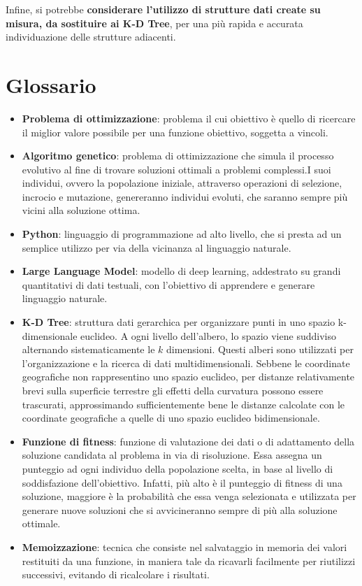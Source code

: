 \documentclass{CSUniSchoolLabReport}
\begin{document}
Infine, si potrebbe \textbf{considerare l'utilizzo di strutture dati create su misura, da sostituire ai K-D Tree}, per una più rapida e accurata individuazione delle strutture adiacenti.

\pagebreak{}
\section{Glossario}

\begin{itemize}
   \item \textbf{Problema di ottimizzazione}: problema il cui obiettivo è quello di ricercare il miglior valore possibile per una funzione obiettivo, soggetta a vincoli.
   \item \textbf{Algoritmo genetico}: problema di ottimizzazione che simula il processo evolutivo al fine di trovare soluzioni ottimali a problemi complessi.I suoi individui, ovvero la popolazione iniziale, attraverso operazioni di selezione, incrocio e mutazione, genereranno individui evoluti, che saranno sempre più vicini alla soluzione ottima.
   \item \textbf{Python}: linguaggio di programmazione ad alto livello, che si presta ad un semplice utilizzo per via della vicinanza al linguaggio naturale.
   \item \textbf{Large Language Model}: modello di deep learning, addestrato su grandi quantitativi di dati testuali, con l'obiettivo di apprendere e generare linguaggio naturale.
   \item \textbf{K-D Tree}: struttura dati gerarchica per organizzare punti in uno spazio k-dimensionale euclideo. A ogni livello dell'albero, lo spazio viene suddiviso alternando sistematicamente le $k$ dimensioni. Questi alberi sono utilizzati per l'organizzazione e la ricerca di dati multidimensionali. Sebbene le coordinate geografiche non rappresentino uno spazio euclideo, per distanze relativamente brevi sulla superficie terrestre gli effetti della curvatura possono essere trascurati, approssimando sufficientemente bene le distanze calcolate con le coordinate geografiche a quelle di uno spazio euclideo bidimensionale.
   \item \textbf{Funzione di fitness}: funzione di valutazione dei dati o di adattamento della soluzione candidata al problema in via di risoluzione. Essa assegna un punteggio ad ogni individuo della popolazione scelta, in base al livello di soddisfazione dell'obiettivo. Infatti, più alto è il punteggio di fitness di una soluzione, maggiore è la probabilità che essa venga selezionata e utilizzata per generare nuove soluzioni che si avvicineranno sempre di più alla soluzione ottimale.
   \item \textbf{Memoizzazione}: tecnica che consiste nel salvataggio in memoria dei valori restituiti da una funzione, in maniera tale da ricavarli facilmente per riutilizzi successivi, evitando di ricalcolare i risultati. 
\end{itemize}
\end{document}
